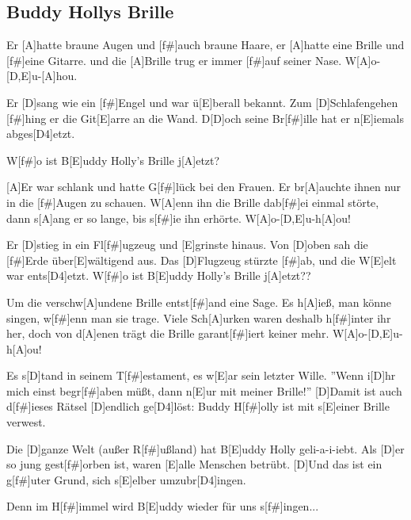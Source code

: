 \subsection*{Buddy Hollys Brille   }
\begin{guitar}
Er [A]hatte braune Augen und [f#]auch braune Haare,
er [A]hatte eine Brille und [f#]eine Gitarre.
und die [A]Brille trug er immer [f#]auf seiner Nase. W[A]o-[D,E]u-[A]hou.


Er [D]sang wie ein [f#]Engel und war ü[E]berall bekannt.
Zum [D]Schlafengehen [f#]hing er die Git[E]arre an die Wand.
D[D]och seine Br[f#]ille hat er n[E]iemals abges[D4]etzt.

W[f#]o ist B[E]uddy Holly's Brille j[A]etzt?



[A]Er war schlank und hatte G[f#]lück bei den Frauen.
Er br[A]auchte ihnen nur in die [f#]Augen zu schauen.
W[A]enn ihn die Brille dab[f#]ei einmal störte,
dann s[A]ang er so lange, bis s[f#]ie ihn erhörte. W[A]o-[D,E]u-h[A]ou!


Er [D]stieg in ein Fl[f#]ugzeug und [E]grinste hinaus.
Von [D]oben sah die [f#]Erde über[E]wältigend aus.
Das [D]Flugzeug stürzte [f#]ab, und die W[E]elt war ents[D4]etzt.
W[f#]o ist B[E]uddy Holly's Brille j[A]etzt??



Um die verschw[A]undene Brille entst[f#]and eine Sage.
Es h[A]ieß, man könne singen, w[f#]enn man sie trage.
Viele Sch[A]urken waren deshalb h[f#]inter ihr her,
doch von d[A]enen trägt die Brille garant[f#]iert keiner mehr. W[A]o-[D,E]u-h[A]ou!


Es s[D]tand in seinem T[f#]estament, es w[E]ar sein letzter Wille.
''Wenn i[D]hr mich einst begr[f#]aben müßt, dann n[E]ur mit meiner Brille!''
[D]Damit ist auch d[f#]ieses Rätsel [D]endlich ge[D4]löst:
Buddy H[f#]olly ist mit s[E]einer Brille verwest.



Die [D]ganze Welt (außer R[f#]ußland) hat B[E]uddy Holly geli-a-i-iebt.
Als [D]er so jung gest[f#]orben ist, waren [E]alle Menschen betrübt.
[D]Und das ist ein g[f#]uter Grund, sich s[E]elber umzubr[D4]ingen.

Denn im H[f#]immel wird B[E]uddy wieder für uns s[f#]ingen...
\end{guitar}
